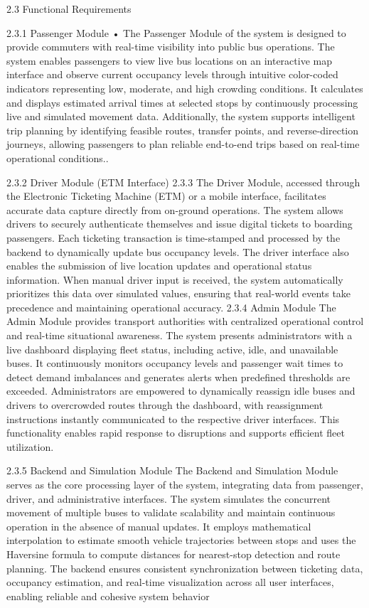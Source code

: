 2.3 Functional Requirements


2.3.1 Passenger Module
•	The Passenger Module of the system is designed to provide commuters with real-time visibility into public bus operations. The system enables passengers to view live bus locations on an interactive map interface and observe current occupancy levels through intuitive color-coded indicators representing low, moderate, and high crowding conditions. It calculates and displays estimated arrival times at selected stops by continuously processing live and simulated movement data. Additionally, the system supports intelligent trip planning by identifying feasible routes, transfer points, and reverse-direction journeys, allowing passengers to plan reliable end-to-end trips based on real-time operational conditions..


2.3.2	Driver Module (ETM Interface)
2.3.3	The Driver Module, accessed through the Electronic Ticketing Machine (ETM) or a mobile interface, facilitates accurate data capture directly from on-ground operations. The system allows drivers to securely authenticate themselves and issue digital tickets to boarding passengers. Each ticketing transaction is time-stamped and processed by the backend to dynamically update bus occupancy levels. The driver interface also enables the submission of live location updates and operational status information. When manual driver input is received, the system automatically prioritizes this data over simulated values, ensuring that real-world events take precedence and maintaining operational accuracy.
2.3.4	Admin Module
The Admin Module provides transport authorities with centralized operational control and real-time situational awareness. The system presents administrators with a live dashboard displaying fleet status, including active, idle, and unavailable buses. It continuously monitors occupancy levels and passenger wait times to detect demand imbalances and generates alerts when predefined thresholds are exceeded. Administrators are empowered to dynamically reassign idle buses and drivers to overcrowded routes through the dashboard, with reassignment instructions instantly communicated to the respective driver interfaces. This functionality enables rapid response to disruptions and supports efficient fleet utilization.

2.3.5	Backend and Simulation Module
The Backend and Simulation Module serves as the core processing layer of the system, integrating data from passenger, driver, and administrative interfaces. The system simulates the concurrent movement of multiple buses to validate scalability and maintain continuous operation in the absence of manual updates. It employs mathematical interpolation to estimate smooth vehicle trajectories between stops and uses the Haversine formula to compute distances for nearest-stop detection and route planning. The backend ensures consistent synchronization between ticketing data, occupancy estimation, and real-time visualization across all user interfaces, enabling reliable and cohesive system behavior


